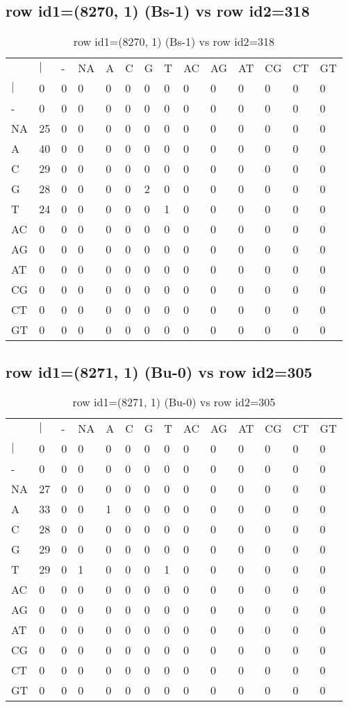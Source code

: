 \subsection{row id1=(8270, 1) (Bs-1) vs row id2=318}
\begin{center}
\begin{longtable}{|l|l|l|l|l|l|l|l|l|l|l|l|l|l|}
\caption{row id1=(8270, 1) (Bs-1) vs row id2=318} \label{table_dm228}\\
\hline
\\
\hline
&$|$&-&NA&A&C&G&T&AC&AG&AT&CG&CT&GT\\
$|$&0&0&0&0&0&0&0&0&0&0&0&0&0\\
-&0&0&0&0&0&0&0&0&0&0&0&0&0\\
NA&25&0&0&0&0&0&0&0&0&0&0&0&0\\
A&40&0&0&0&0&0&0&0&0&0&0&0&0\\
C&29&0&0&0&0&0&0&0&0&0&0&0&0\\
G&28&0&0&0&0&2&0&0&0&0&0&0&0\\
T&24&0&0&0&0&0&1&0&0&0&0&0&0\\
AC&0&0&0&0&0&0&0&0&0&0&0&0&0\\
AG&0&0&0&0&0&0&0&0&0&0&0&0&0\\
AT&0&0&0&0&0&0&0&0&0&0&0&0&0\\
CG&0&0&0&0&0&0&0&0&0&0&0&0&0\\
CT&0&0&0&0&0&0&0&0&0&0&0&0&0\\
GT&0&0&0&0&0&0&0&0&0&0&0&0&0\\
\hline
\end{longtable}
\end{center}

\subsection{row id1=(8271, 1) (Bu-0) vs row id2=305}
\begin{center}
\begin{longtable}{|l|l|l|l|l|l|l|l|l|l|l|l|l|l|}
\caption{row id1=(8271, 1) (Bu-0) vs row id2=305} \label{table_dm230}\\
\hline
\\
\hline
&$|$&-&NA&A&C&G&T&AC&AG&AT&CG&CT&GT\\
$|$&0&0&0&0&0&0&0&0&0&0&0&0&0\\
-&0&0&0&0&0&0&0&0&0&0&0&0&0\\
NA&27&0&0&0&0&0&0&0&0&0&0&0&0\\
A&33&0&0&1&0&0&0&0&0&0&0&0&0\\
C&28&0&0&0&0&0&0&0&0&0&0&0&0\\
G&29&0&0&0&0&0&0&0&0&0&0&0&0\\
T&29&0&1&0&0&0&1&0&0&0&0&0&0\\
AC&0&0&0&0&0&0&0&0&0&0&0&0&0\\
AG&0&0&0&0&0&0&0&0&0&0&0&0&0\\
AT&0&0&0&0&0&0&0&0&0&0&0&0&0\\
CG&0&0&0&0&0&0&0&0&0&0&0&0&0\\
CT&0&0&0&0&0&0&0&0&0&0&0&0&0\\
GT&0&0&0&0&0&0&0&0&0&0&0&0&0\\
\hline
\end{longtable}
\end{center}

